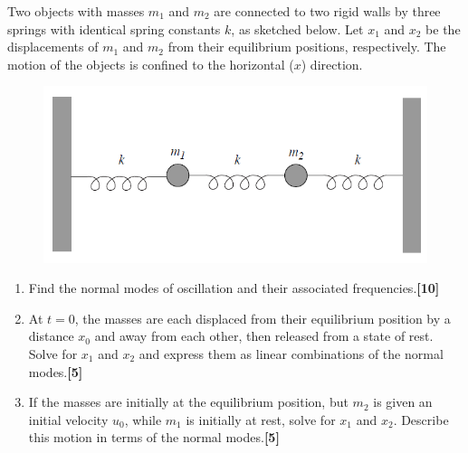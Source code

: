 \documentclass[a4paper]{article}
\begin{document}
\begin{qns}
Two objects with masses $m_1$ and $m_2$ are connected to two rigid walls by three springs with identical spring constants $k$, as sketched below. Let $x_1$ and $x_2$ be the displacements of $m_1$ and $m_2$ from their equilibrium positions, respectively. The motion of the objects is confined to the horizontal ($x$) direction. 
\begin{figure}[H]
    \centering
    \includegraphics[scale=0.5]{2013P2Q7.PNG}
\end{figure}
\begin{enumerate}[label=(\roman*)]
\item Find the normal modes of oscillation and their associated frequencies.\hfill\textbf{[10]}
\item At $t = 0$, the masses are each displaced from their equilibrium position by a distance $x_0$ and away from each other, then released from a state of rest. Solve for $x_1$ and $x_2$ and express them as linear combinations of the normal modes.\hfill\textbf{[5]}
\item If the masses are initially at the equilibrium position, but $m_2$ is given an initial velocity $u_0$, while $m_1$ is initially at rest, solve for $x_1$ and $x_2$. Describe this motion in terms of the normal modes.\hfill\textbf{[5]}
\end{enumerate}
\end{qns}
\end{document}
